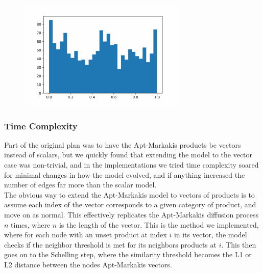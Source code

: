 \documentclass[12pt,twoside]{report}
\begin{document}
\begin{figure}[H]
\begin{center}
\begin{minipage}{0.45\linewidth}
\end{minipage}
\hfill
\begin{minipage}{0.45\linewidth}
\includegraphics[width=\linewidth]{figures/hist2.png}
\end{minipage}
\end{center}
\end{figure}

\subsubsection{Time Complexity}

Part of the original plan was to have the Apt-Markakis products be vectors instead of scalars, but we quickly found that extending the model to the vector case was non-trivial, and in the implementations we tried time complexity soared for minimal changes in how the model evolved, and if anything increased the number of edges far more than the scalar model. \\

The obvious way to extend the Apt-Markakis model to vectors of products is to assume each index of the vector corresponds to a given category of product, and move on as normal. This effectively replicates the Apt-Markakis diffusion process $n$ times, where $n$ is the length of the vector. This is the method we implemented, where for each node with an unset product at index $i$ in its vector, the model checks if the neighbor threshold is met for its neighbors products at $i$. This then goes on to the Schelling step, where the similarity threshold becomes the L1 or L2 distance between the nodes Apt-Markakis vectors. \\
\end{document}
